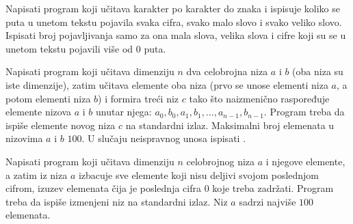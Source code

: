 \begin{Exercise}[label=v2.1_04] 
Napisati program koji učitava karakter po karakter do znaka
 i ispisuje koliko se puta u unetom tekstu pojavila svaka
cifra, svako malo slovo i svako veliko slovo. Ispisati broj
pojavljivanja samo za ona mala slova, velika slova i cifre koji su se
u unetom tekstu pojavili više od $0$ puta. 
\end{Exercise}
\begin{Answer}[ref=v2.1_04]
\end{Answer}

\begin{Exercise}[label=v2.1_05] 
Napisati program koji učitava dimenziju $n$ dva celobrojna niza $a$ i
$b$ (oba niza su iste dimenzije), zatim učitava elemente oba niza
(prvo se unose elementi niza $a$, a potom elementi niza $b$) i formira
treći niz $c$ tako što naizmenično raspoređuje elemente nizova $a$ i
$b$ unutar njega: $a_0, b_0, a_1, b_1, \ldots, a_{n-1},
b_{n-1}$. Program treba da ispiše elemente novog niza $c$ na
standardni izlaz. Maksimalni broj elemenata u nizovima $a$ i $b$
$100$. U slučaju neispravnog unosa ispisati .
\end{Exercise}
\begin{Answer}[ref=v2.1_05]
\end{Answer}

\begin{Exercise}[label=v2.1_06] 
Napisati program koji učitava dimenziju $n$ celobrojnog niza $a$ i
njegove elemente, a zatim iz niza $a$ izbacuje sve elemente koji nisu
deljivi svojom poslednjom cifrom, izuzev elemenata čija je poslednja
cifra $0$ koje treba zadržati. Program treba da ispiše izmenjeni niz
na standardni izlaz. Niz $a$ sadrzi najviše $100$ elemenata.
\end{Exercise}
\begin{Answer}[ref=v2.1_06]
\end{Answer}

